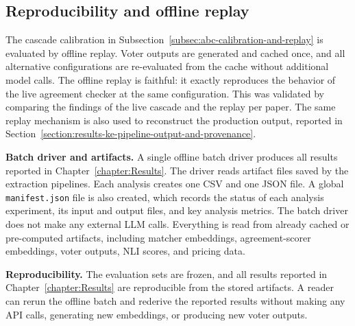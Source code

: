 \subsection{Reproducibility and offline replay}\label{subsec:eval-reprod-offline-replay}

The cascade calibration in Subsection~\ref{subsec:abc-calibration-and-replay} is evaluated by offline replay. Voter outputs are generated and cached once, and all alternative configurations are re-evaluated from the cache without additional model calls. The offline replay is faithful: it exactly reproduces the behavior of the live agreement checker at the same configuration. This was validated by comparing the findings of the live cascade and the replay per paper. The same replay mechanism is also used to reconstruct the production output, reported in Section~\ref{section:results-ke-pipeline-output-and-provenance}.

\textbf{Batch driver and artifacts.} A single offline batch driver produces all results reported in Chapter~\ref{chapter:Results}. The driver reads artifact files saved by the extraction pipelines. Each analysis creates one CSV and one JSON file. A global \texttt{manifest.json} file is also created, which records the status of each analysis experiment, its input and output files, and key analysis metrics. The batch driver does not make any external LLM calls. Everything is read from already cached or pre-computed artifacts, including matcher embeddings, agreement-scorer embeddings, voter outputs, NLI scores, and pricing data. 

\textbf{Reproducibility.} The evaluation sets are frozen, and all results reported in Chapter~\ref{chapter:Results} are reproducible from the stored artifacts. A reader can rerun the offline batch and rederive the reported results without making any API calls, generating new embeddings, or producing new voter outputs.